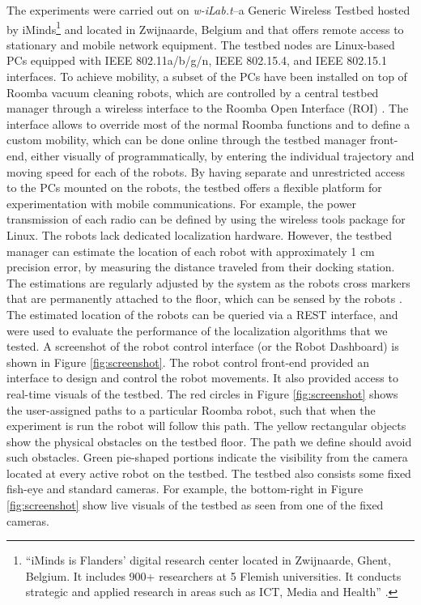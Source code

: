 \documentclass[journal]{IEEEtran} 				\IEEEoverridecommandlockouts 						\usepackage{amsmath,amssymb}
\begin{document}
The experiments were carried out on \textit{w-iLab.t}--a Generic Wireless Testbed hosted by iMinds\footnote{``iMinds is Flanders' digital research center located in Zwijnaarde, Ghent, Belgium. It includes 900+ researchers at 5 Flemish universities. It conducts strategic and applied research in areas such as ICT, Media and Health'' \cite{iMinds}.} and located in Zwijnaarde, Belgium and that offers remote access to stationary and mobile network equipment. The testbed nodes are Linux-based PCs equipped with IEEE 802.11a/b/g/n, IEEE 802.15.4, and IEEE 802.15.1 interfaces. To achieve mobility, a subset of the PCs have been installed on top of Roomba vacuum cleaning robots, which are controlled by a central testbed manager through a wireless interface to the Roomba Open Interface (ROI) \cite{becue2012}. The interface allows to override most of the normal Roomba functions and to define a custom mobility, which can be done online through the testbed manager front-end, either visually of programmatically, by entering 
the individual trajectory and moving speed for each of the robots. By having separate and unrestricted access to the PCs mounted on the robots, the testbed offers a flexible platform for experimentation with mobile communications. For example, the power transmission of each radio can be defined by using the wireless tools package for Linux. The robots lack dedicated localization hardware. However, the testbed manager can estimate the location of each robot with approximately 1 cm precision error, by measuring the distance traveled from their docking station. The estimations are regularly adjusted by the system as the robots cross markers that are permanently attached to the floor, which can be sensed by the robots \cite{becue2012}. The estimated location of the robots can be queried via a REST interface, and were used to evaluate the performance of the localization algorithms that we tested. A screenshot of the robot control interface (or the Robot Dashboard) is shown in Figure \ref{fig:screenshot}. The 
robot control front-end provided an interface to design and control the robot movements. It also provided access to real-time visuals of the testbed. The red circles in Figure \ref{fig:screenshot} shows the user-assigned paths to a particular Roomba robot, such that when the experiment is run the   robot will follow this path. The yellow rectangular objects show the physical obstacles on the testbed floor. The path we define should avoid such obstacles. Green pie-shaped portions indicate the visibility from the camera located at every active robot on the testbed. The testbed also consists some fixed fish-eye and standard cameras. For example, the bottom-right in Figure \ref{fig:screenshot} show live visuals of the testbed as seen from one of the fixed cameras.
\end{document}
